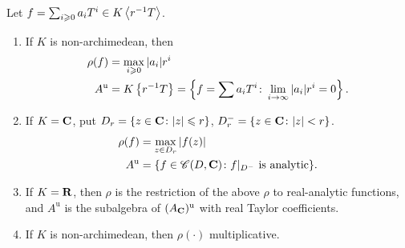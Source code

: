 \begin{theorem}
Let $f=\sum_{i\geqslant 0} a_i T^i\in K\left\langle r^{-1} T \right\rangle$. 
\begin{enumerate}
\item
If $K$ is non-archimedean, then 
\begin{align*}
	\rho(f) &= \max_{i\geqslant 0} |a_i| r^i \\
	A^\mathrm{u} &= K\left\{ r^{-1} T \right\} = \left\{f=\sum a_i T^i\colon \lim_{i\to \infty} |a_i| r^i = 0\right\} .
\end{align*}

\item
If $K=\mathbf{C}$, put $D_r=\{z\in \mathbf{C}\colon |z|\leqslant r\}$, 
$D_r^-=\{z\in \mathbf{C}\colon |z|<r\}$. 
\begin{align*}
	\rho(f) &= \max_{z\in D_r} |f(z)| \\
	A^\mathrm{u} &= \{f\in \mathscr{C}(D,\mathbf{C})\colon f|_{D^-}\text{ is analytic}\} .
\end{align*}

\item
If $K=\mathbf{R}$, then $\rho$ is the restriction of the above $\rho$ to real-analytic 
functions, and $A^\mathrm{u}$ is the subalgebra of $(A_{\mathbf{C}})^\mathrm{u}$ with 
real Taylor coefficients. 

\item
If $K$ is non-archimedean, then $\rho(\cdot)$ multiplicative. 
\end{enumerate}
\end{theorem}
